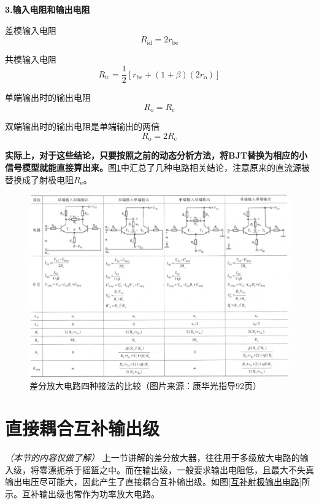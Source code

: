 \textbf{3.输入电阻和输出电阻}

差模输入电阻
\begin{equation}
    R_\mathrm{id}=2r_\mathrm{be}
\end{equation}

共模输入电阻
\begin{equation}
    R_\mathrm{ic}=\frac{1}{2}[r_\mathrm{be}+(1+\beta)(2r_\mathrm{o})]
\end{equation}

单端输出时的输出电阻
\begin{equation}
    R_\mathrm{o}=R_\mathrm{c}
\end{equation}

双端输出时的输出电阻是单端输出的两倍
\begin{equation}
    R_\mathrm{o}=2R_\mathrm{c}
\end{equation}

\textbf{实际上，对于这些结论，只要按照之前的动态分析方法，将BJT替换为相应的小信号模型就能直接算出来。}图\ref{差分放大电路四种接法的比较}中汇总了几种电路相关结论，注意原来的直流源被替换成了射极电阻$R_\mathrm{e}$。

\begin{figure}[htb]
    \centering
    \includegraphics[width=0.95\linewidth]{pic/差分放大电路四种接法的比较.png}
    \caption{差分放大电路四种接法的比较（图片来源：康华光指导92页）\label{差分放大电路四种接法的比较}}
\end{figure}

\section{直接耦合互补输出级}
\textit{（本节的内容仅做了解）}
上一节讲解的差分放大器，往往用于多级放大电路的输入级，将零漂扼杀于摇篮之中。而在输出级，一般要求输出电阻低，且最大不失真输出电压尽可能大，因此产生了直接耦合互补输出级。如图\ref{互补射极输出电路}所示。互补输出级也常作为功率放大电路。

